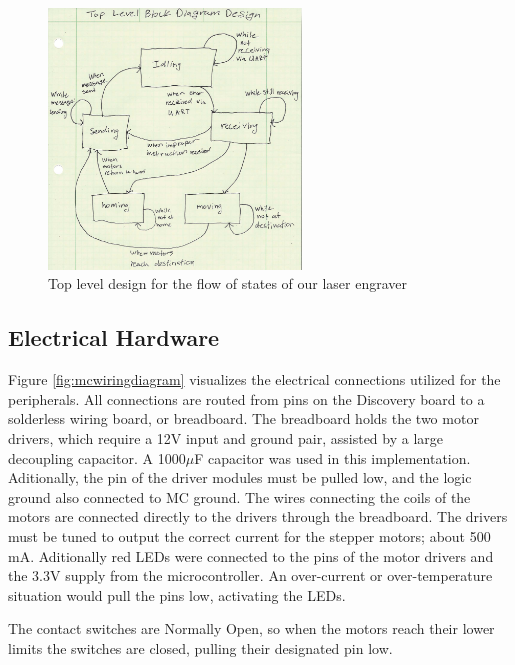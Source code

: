 \documentclass[11pt]{LaTeX-Classes/math-hw}
\begin{document}
 \begin{figure}[H]
   \begin{center}
     \includegraphics[width=0.6\textwidth]{blockdiagram}
     \caption{Top level design for the flow of states of our laser engraver}
     \label{fig:blockdiagram}
   \end{center}
 \end{figure}



\subsection{Electrical Hardware}
Figure \ref{fig:mcwiringdiagram} visualizes the electrical connections utilized for the peripherals.
All connections are routed from pins on the Discovery board to a solderless wiring board, or breadboard.
The breadboard holds the two motor drivers, which require a 12V input and ground pair,
assisted by a large decoupling capacitor. A 1000$\mu$F capacitor was used in this implementation.
Aditionally, the  pin of the driver modules must be pulled low, and the logic ground also
connected to MC ground. The wires connecting the coils of the motors are connected directly to the
drivers through the breadboard. The drivers must be tuned to output the correct current
for the stepper motors; about 500 mA. 
Aditionally red LEDs were connected to the  pins of the motor drivers and
the 3.3V supply from the microcontroller. An over-current or over-temperature situation
would pull the  pins low, activating the LEDs.

The contact switches are Normally Open, so when the motors reach their lower limits the switches
are closed, pulling their designated pin low.
\end{document}
